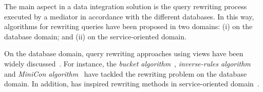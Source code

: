 The main aspect in a data integration solution is 
the query rewriting process executed by a mediator
in accordance with the different databases.
%
In this way, algorithms for rewriting queries have
been proposed in two domains: (i) on the database 
domain; and (ii) on the service-oriented domain.

On the database domain, query rewriting approaches using
views have been widely discussed~\cite{Halevy:2001}.
%
For instance, the \textit{bucket algorithm}~\cite{Levy:1996}, 
\textit{inverse-rules algorithm}~\cite{Duschka:1997} and 
\textit{MiniCon algorithm}~\cite{Pottinger:2001} have
tackled the rewriting problem on the database domain.
%
In addition, \cite{Pottinger:2001} has inspired rewriting methods in service-oriented domain~\cite{costa2013,ba2014}.

